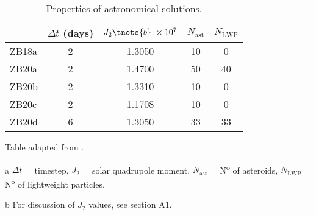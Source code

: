 \documentclass[]{agujournal2019}
\begin{document}

\begin{table}
\begin{threeparttable}
\caption{Properties of astronomical solutions.\label{tab:astronomical-solutions}}
\centering
\begin{tabular}{lcccc}
 & \(\Delta{}t\) (days) & \(J_{2}\tnote{b}~\times10^{7}\) & \(N_{\text{ast}}\) & \(N_{\text{LWP}}\) \\
\hline
ZB18a & 2 & \num{1.3050} & 10 & 0 \\
ZB20a & 2 & \num{1.4700} & 50 & 40 \\
ZB20b & 2 & \num{1.3310} & 10 & 0 \\
ZB20c & 2 & \num{1.1708} & 10 & 0 \\
ZB20d & 6 & \num{1.3050} & 33 & 33 \\
\end{tabular}
\begin{tablenotes}
  \item Table adapted from .
  \item [a] \(\Delta{}t\) = timestep, \(J_{2}\) = solar quadrupole moment, \(N_{\text{ast}}\) = N\textsuperscript{o} of asteroids, \(N_\text{LWP}\) = N\textsuperscript{o} of lightweight particles.
  \item [b] For discussion of \(J_{2}\) values, see  section A1.
\end{tablenotes}
\end{threeparttable}
\end{table}
\end{document}
